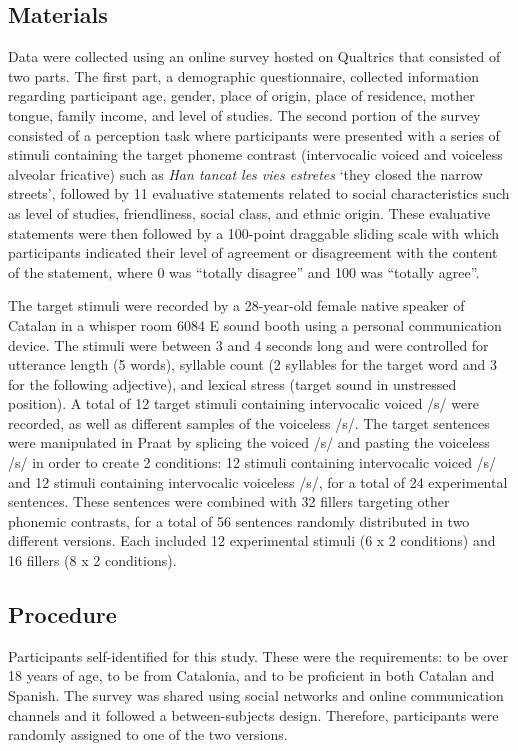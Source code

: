\documentclass[
  a4paper,
  11pt,
  twocolumn]{article}
\begin{document}
\subsection{Materials}

Data were collected using an online survey hosted on Qualtrics that
consisted of two parts. The first part, a demographic questionnaire,
collected information regarding participant age, gender, place of
origin, place of residence, mother tongue, family income, and level of
studies. The second portion of the survey consisted of a perception task
where participants were presented with a series of stimuli containing
the target phoneme contrast (intervocalic voiced and voiceless alveolar
fricative) such as \emph{Han tancat les vies estretes} `they closed the
narrow streets', followed by 11 evaluative statements related to social
characteristics such as level of studies, friendliness, social class,
and ethnic origin. These evaluative statements were then followed by a
100-point draggable sliding scale with which participants indicated
their level of agreement or disagreement with the content of the
statement, where 0 was ``totally disagree'' and 100 was ``totally
agree''.

The target stimuli were recorded by a 28-year-old female native speaker
of Catalan in a whisper room 6084 E sound booth using a personal
communication device. The stimuli were between 3 and 4 seconds long and
were controlled for utterance length (5 words), syllable count (2
syllables for the target word and 3 for the following adjective), and
lexical stress (target sound in unstressed position). A total of 12
target stimuli containing intervocalic voiced /s/ were recorded, as well
as different samples of the voiceless /s/. The target sentences were
manipulated in Praat by splicing the voiced /s/ and pasting the
voiceless /s/ in order to create 2 conditions: 12 stimuli containing
intervocalic voiced /s/ and 12 stimuli containing intervocalic voiceless
/s/, for a total of 24 experimental sentences. These sentences were
combined with 32 fillers targeting other phonemic contrasts, for a total
of 56 sentences randomly distributed in two different versions. Each
included 12 experimental stimuli (6 x 2 conditions) and 16 fillers (8 x
2 conditions).

\subsection{Procedure}

Participants self-identified for this study. These were the
requirements: to be over 18 years of age, to be from Catalonia, and to
be proficient in both Catalan and Spanish. The survey was shared using
social networks and online communication channels and it followed a
between-subjects design. Therefore, participants were randomly assigned
to one of the two versions.
\end{document}
